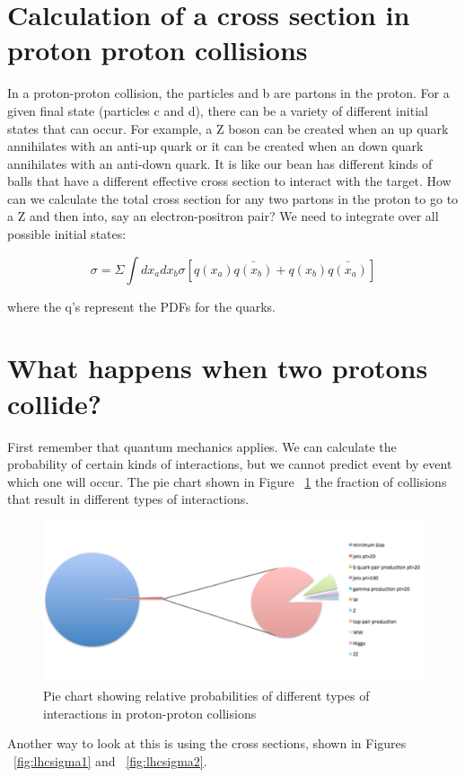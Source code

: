 \section{Calculation of a cross section in proton proton collisions}

In a proton-proton collision, the particles and b are partons in the proton.  For a given final state (particles c and d), there can be a variety of different initial states that can occur.  For example, a Z boson can be created when an up quark annihilates with an anti-up quark or it can be created when an down quark annihilates with an anti-down quark.  It is like our bean has different kinds of balls that have a different effective cross section to interact with the target.  How can we calculate the total cross section for any two partons in the proton to go to a Z and then into, say an electron-positron pair?  We need to integrate over all possible initial states:

\begin{equation}
\sigma = \Sigma \int{dx_a dx_b \sigma[q(x_a)\bar{q(x_b)}+q(x_b)\bar{q(x_a)}]}
\end{equation}

where the q's represent the PDFs for the quarks.

\section{What happens when two protons collide?}
First remember that quantum mechanics applies.  We can calculate the probability of certain kinds of interactions, but we cannot predict event by event which one will occur.  The pie chart shown in Figure ~\ref{fig:productionprobs} the fraction of collisions that result in different types of interactions.

\begin{figure}[h]
\centering\includegraphics[scale=0.5]{./protonprotoncollisions/Pictures/fig3.pdf}
\caption{Pie chart showing relative probabilities of different types of interactions in proton-proton collisions}
\label{fig:productionprobs}
\end{figure}
Another way to look at this is using the cross sections, shown in Figures ~\ref{fig:lhcsigma1} and  ~\ref{fig:lhcsigma2}.


